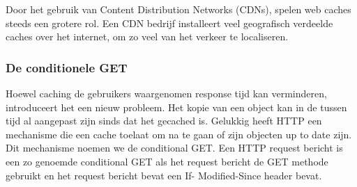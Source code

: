 Door het gebruik van Content Distribution Networks (CDNs), spelen web caches steeds een grotere rol. Een CDN bedrijf installeert veel geografisch verdeelde caches over het internet, om zo veel van het verkeer te localiseren.

\subsubsection{De conditionele GET}

Hoewel caching de gebruikers waargenomen response tijd kan verminderen, introduceert het een nieuw probleem. Het kopie van een object kan in de tussen tijd al aangepast zijn sinds dat het gecached is. Gelukkig heeft HTTP een mechanisme die een cache toelaat om na te gaan of zijn objecten up to date zijn. Dit mechanisme noemen we de conditional GET. Een HTTP request bericht is een zo genoemde conditional GET als het request bericht de GET methode gebruikt en het request bericht bevat een If- Modified-Since header bevat.
